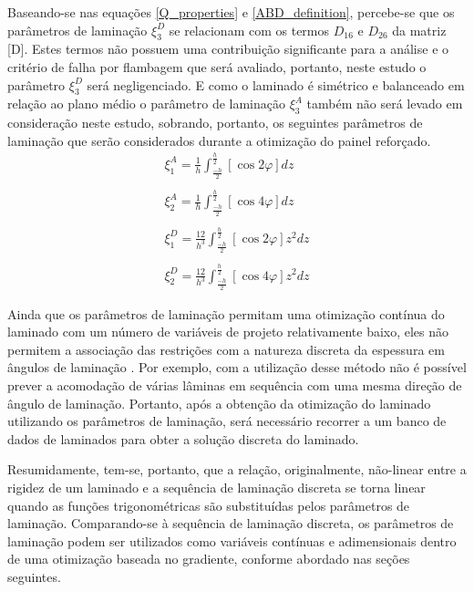 Baseando-se nas equações \autoref{Q_properties} e \autoref{ABD_definition}, percebe-se que os parâmetros de laminação $\xi^D_3$ se relacionam com os termos $D_{16}$ e $D_{26}$ da matriz [D]. Estes termos não possuem uma contribuição significante para a análise e o critério de falha por flambagem que será avaliado, portanto, neste estudo o parâmetro $\xi^D_3$ será negligenciado. E como o laminado é simétrico e balanceado em relação ao plano médio o parâmetro de laminação $\xi^A_3$ também não será levado em consideração neste estudo, sobrando, portanto, os seguintes parâmetros de laminação que serão considerados durante a otimização do painel reforçado.
\begin{equation}\label{LP_AeD}
\begin{gathered}
\xi^A_{1} = \frac{1}{h}\int^{\frac{h}{2}}_{\frac{-h}{2}}[\cos2\varphi]dz\\~\\
\xi^A_{2} = \frac{1}{h}\int^{\frac{h}{2}}_{\frac{-h}{2}}[\cos4\varphi]dz\\~\\
\xi^D_{1} = \frac{12}{h^3}\int^{\frac{h}{2}}_{\frac{-h}{2}}[\cos2\varphi]z^2dz\\~\\
\xi^D_{2} = \frac{12}{h^3}\int^{\frac{h}{2}}_{\frac{-h}{2}}[\cos4\varphi]z^2dz
\end{gathered}
\end{equation}

Ainda que os parâmetros de laminação permitam uma otimização contínua do laminado com um número de variáveis de projeto relativamente baixo, eles não permitem a associação das restrições com a natureza discreta da espessura em ângulos de laminação \cite{liu2004maximization}. Por exemplo, com a utilização desse método não é possível prever a acomodação de várias lâminas em sequência com uma mesma direção de ângulo de laminação. Portanto, após a obtenção da otimização do laminado utilizando os parâmetros de laminação, será necessário recorrer a um banco de dados de laminados para obter a solução discreta do laminado.

Resumidamente, tem-se, portanto, que a relação, originalmente, não-linear entre a rigidez de um laminado e a sequência de laminação discreta se torna linear quando as funções trigonométricas são substituídas pelos parâmetros de laminação. Comparando-se à sequência de laminação discreta, os parâmetros de laminação podem ser utilizados como variáveis contínuas e adimensionais dentro de uma otimização baseada no gradiente, conforme abordado nas seções seguintes.

